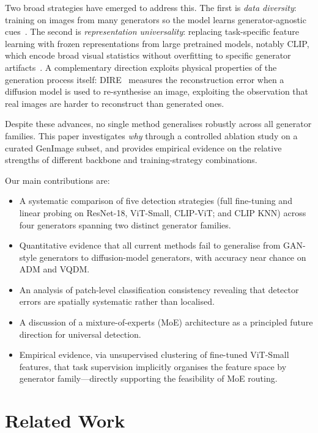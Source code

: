 \documentclass{article}
\begin{document}
Two broad strategies have emerged to address this.
The first is \emph{data diversity}: training on images from many generators so the model learns generator-agnostic cues~\cite{zhu2023genimage}.
The second is \emph{representation universality}: replacing task-specific feature learning with frozen representations from large pretrained models, notably CLIP, which encode broad visual statistics without overfitting to specific generator artifacts~\cite{ojha2023towards}.
A complementary direction exploits physical properties of the generation process itself: DIRE~\cite{wang2023dire} measures the reconstruction error when a diffusion model is used to re-synthesise an image, exploiting the observation that real images are harder to reconstruct than generated ones.

Despite these advances, no single method generalises robustly across all generator families.
This paper investigates \emph{why} through a controlled ablation study on a curated GenImage subset, and provides empirical evidence on the relative strengths of different backbone and training-strategy combinations.

Our main contributions are:
\begin{itemize}
    \item A systematic comparison of five detection strategies (full fine-tuning and linear probing on ResNet-18, ViT-Small, CLIP-ViT; and CLIP KNN) across four generators spanning two distinct generator families.
    \item Quantitative evidence that all current methods fail to generalise from GAN-style generators to diffusion-model generators, with accuracy near chance on ADM and VQDM.
    \item An analysis of patch-level classification consistency revealing that detector errors are spatially systematic rather than localised.
    \item A discussion of a mixture-of-experts (MoE) architecture as a principled future direction for universal detection.
    \item Empirical evidence, via unsupervised clustering of fine-tuned ViT-Small features, that task supervision implicitly organises the feature space by generator family—directly supporting the feasibility of MoE routing.
\end{itemize}


\section{Related Work}
\end{document}
